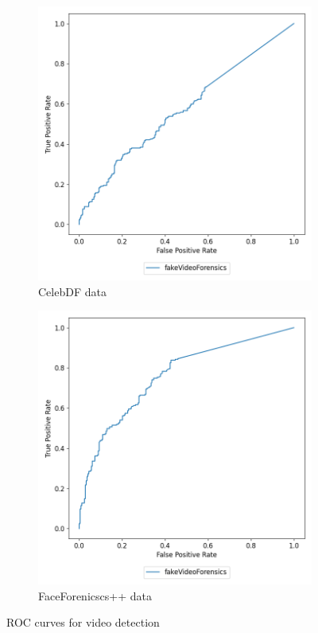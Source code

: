 \begin{figure}[H]
    \begin{subfigure}[h]{0.5\linewidth}
        \centering
        \includegraphics[width=1\linewidth]{other-fig/tests/cdf_methods.png}
        \caption{CelebDF data}
    \end{subfigure}
    \hfill
    \begin{subfigure}[h]{0.5\linewidth}
        \centering
        \includegraphics[width=1\linewidth]{other-fig/tests/ff_methods.png}
        \caption{FaceForenicscs++ data}
    \end{subfigure}
    \caption{ROC curves for video detection}
\end{figure}

